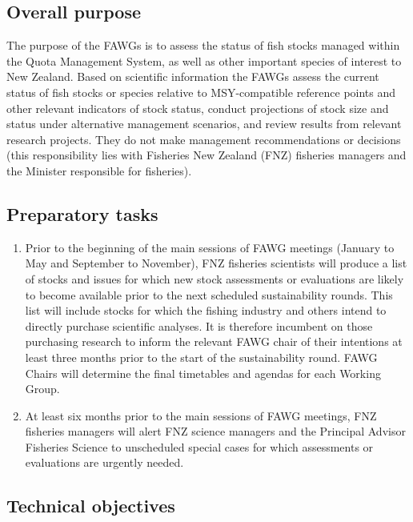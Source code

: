 \documentclass{mpi-plenary}
\theoremstyle{definition}
\theoremstyle{definition}
\theoremstyle{definition}
\theoremstyle{remark}
\begin{document}
\subsection{Overall purpose}\label{overall-purpose}

The purpose of the FAWGs is to assess the status of fish stocks managed
within the Quota Management System, as well as other important species
of interest to New Zealand. Based on scientific information the FAWGs
assess the current status of fish stocks or species relative to
MSY-compatible reference points and other relevant indicators of stock
status, conduct projections of stock size and status under alternative
management scenarios, and review results from relevant research
projects. They do not make management recommendations or decisions (this
responsibility lies with Fisheries New Zealand (FNZ) fisheries managers
and the Minister responsible for fisheries).

\subsection{Preparatory tasks}\label{preparatory-tasks}

\begin{enumerate}
\def\labelenumi{\arabic{enumi}.}
\item
  Prior to the beginning of the main sessions of FAWG meetings (January
  to May and September to November), FNZ fisheries scientists will
  produce a list of stocks and issues for which new stock assessments or
  evaluations are likely to become available prior to the next scheduled
  sustainability rounds. This list will include stocks for which the
  fishing industry and others intend to directly purchase scientific
  analyses. It is therefore incumbent on those purchasing research to
  inform the relevant FAWG chair of their intentions at least three
  months prior to the start of the sustainability round. FAWG Chairs
  will determine the final timetables and agendas for each Working
  Group.
\item
  At least six months prior to the main sessions of FAWG meetings, FNZ
  fisheries managers will alert FNZ science managers and the Principal
  Advisor Fisheries Science to unscheduled special cases for which
  assessments or evaluations are urgently needed.
\end{enumerate}

\subsection{Technical objectives}\label{technical-objectives}
\end{document}
